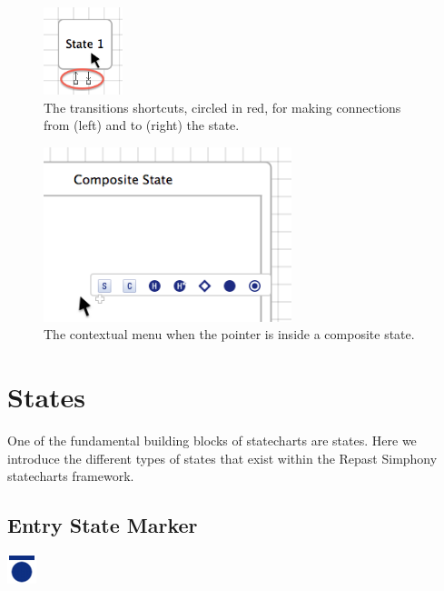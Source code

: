 \documentclass[11pt]{amsart}
\begin{document}
\begin{figure}
\begin{center}
\vspace{.2in}
\centerline {
\includegraphics[height=1in]{StatechartsImages/StateConnectorsHover.png}
}
\caption{The transitions shortcuts, circled in red, for making connections from (left) and to (right) the state.}
\label{fig:stateConnectorsHover}
\end{center}
\end{figure}
\begin{figure}
\begin{center}
\vspace{.2in}
\centerline {
\includegraphics[height=2in]{StatechartsImages/CompositeContextualMenu.png}
}
\caption{The contextual menu when the pointer is inside a composite state.}
\label{fig:compositeContextualMenu}
\end{center}

\end{figure}

\clearpage

\section{States}
\label{sec:states}
One of the fundamental building blocks of statecharts are states. Here we introduce the different types of states that exist within the Repast Simphony statecharts framework.

\subsection{Entry State Marker}
\includegraphics[height=.2in]{StatechartsImages/First-State-32.png}
\end{document}
